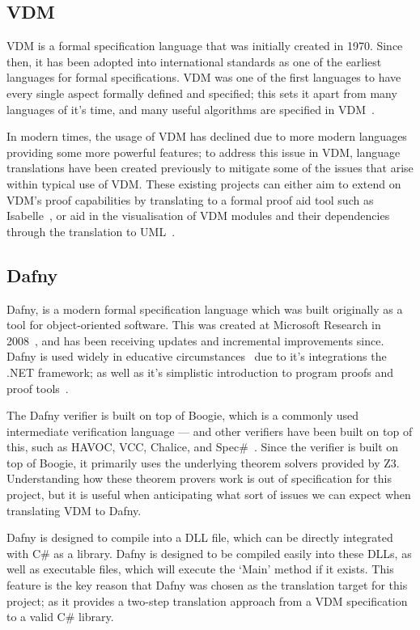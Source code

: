 \documentclass{entcs}
\begin{document}
\subsection{VDM}

VDM is a formal specification language that was initially created in 1970. Since then, it has been adopted into international standards as one of the earliest languages for formal specifications. VDM was one of the first languages to have every single aspect formally defined and specified; this sets it apart from many languages of it's time, and many useful algorithms are specified in VDM~\cite{ISOVDMSL}. 

In modern times, the usage of VDM has declined due to more modern languages providing some more powerful features; to address this issue in VDM, language translations have been created previously to mitigate some of the issues that arise within typical use of VDM. These existing projects can either aim to extend on VDM's proof capabilities by translating to a formal proof aid tool such as Isabelle~\cite{VDM2ISA}, or aid in the visualisation of VDM modules and their dependencies through the translation to UML~\cite{VDM2UML}. 

\subsection{Dafny}\label{section:bg_dafny}

Dafny, is a modern formal specification language which was built originally as a tool for object-oriented software. This was created at Microsoft Research in 2008~\cite{leino2008specification}, and has been receiving updates and incremental improvements since. Dafny is used widely in educative circumstances~\cite{DafnyMicrosoft} due to it's integrations the .NET framework; as well as it's simplistic introduction to program proofs and proof tools~\cite{ProgramProofs}.

The Dafny verifier is built on top of Boogie, which is a commonly used intermediate verification language --- and other verifiers have been built on top of this, such as HAVOC, VCC, Chalice, and Spec\#~\cite{Boogie}. Since the verifier is built on top of Boogie, it primarily uses the underlying theorem solvers provided by Z3. Understanding how these theorem provers work is out of specification for this project, but it is useful when anticipating what sort of issues we can expect when translating VDM to Dafny.

Dafny is designed to compile into a DLL file, which can be directly integrated with C\# as a library. Dafny is designed to be compiled easily into these DLLs, as well as executable files, which will execute the `Main' method if it exists. This feature is the key reason that Dafny was chosen as the translation target for this project; as it provides a two-step translation approach from a VDM specification to a valid C\# library. 
\end{document}
